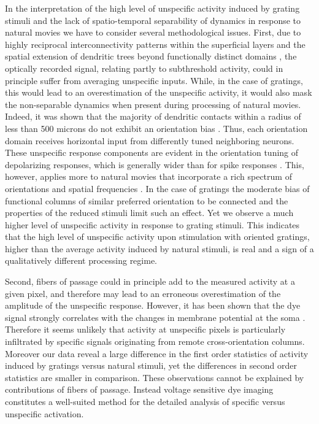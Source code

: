 In the interpretation of the high level of unspecific activity induced by
grating stimuli and the lack of spatio-temporal separability of dynamics in
response to natural movies we have to consider several methodological
issues. First, due to highly reciprocal interconnectivity patterns within
the superficial layers and the spatial extension of dendritic trees beyond
functionally distinct domains \citep{gilbert1989a,douglas2004a}, the
optically recorded signal, relating partly to subthreshold activity, could
in principle suffer from averaging unspecific inputs. While, in the case of
gratings, this would lead to an overestimation of the unspecific activity,
it would also mask the non-separable dynamics when present during
processing of natural movies. Indeed, it was shown that the majority of
dendritic contacts within a radius of less than 500 microns do not exhibit
an orientation bias \citep{malach1993a, bosking1997a, buzas2006a}. Thus,
each orientation domain receives horizontal input from differently tuned
neighboring neurons. These unspecific response components are evident in
the orientation tuning of depolarizing responses, which is generally wider
than for spike responses \citep{monier2003a}. This, however, applies more
to natural movies that incorporate a rich spectrum of orientations and
spatial frequencies \citep{simoncelli2001a}. In the case of gratings the
moderate bias of functional columns of similar preferred orientation to be
connected \citep{rockland1982a, gilbert1989a} and the properties of the
reduced stimuli limit such an effect. Yet we observe a much higher level of
unspecific activity in response to grating stimuli. This indicates that the
high level of unspecific activity upon stimulation with oriented gratings,
higher than the average activity induced by natural stimuli, is real and a
sign of a qualitatively different processing regime. 

Second, fibers of passage could in principle add to the measured activity
at a given pixel, and therefore may lead to an erroneous overestimation of
the amplitude of the unspecific response. However, it has been shown that
the dye signal strongly correlates with the changes in membrane potential
at the soma \citep{sterkin1998a,petersen2003c}. Therefore it seems unlikely
that activity at unspecific pixels is particularly infiltrated by specific
signals originating from remote cross-orientation columns. Moreover our
data reveal a large difference in the first order statistics of activity
induced by gratings versus natural stimuli, yet the differences in second
order statistics are smaller in comparison. These observations cannot be
explained by contributions of fibers of passage. Instead voltage sensitive
dye imaging constitutes a well-suited method for the detailed analysis of
specific versus unspecific activation. 

